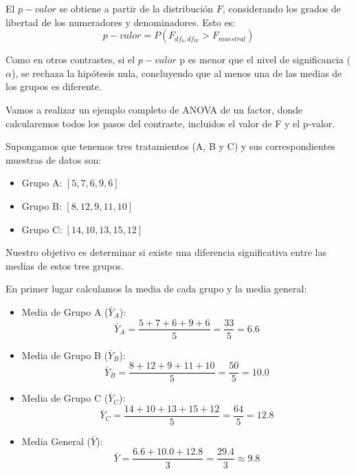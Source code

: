 \documentclass[
  letterpaper,
  DIV=11,
  numbers=noendperiod]{scrreprt}
\providecommand{\tightlist}{%
  \setlength{\itemsep}{0pt}\setlength{\parskip}{0pt}}\usepackage{longtable,booktabs,array}
\begin{document}
El \(p-valor\) se obtiene a partir de la distribución \(F\),
considerando los grados de libertad de los numeradores y denominadores.
Esto es: \[
p-valor=P(F_{df_b,df_W}>F_{muestral})
\]

Como en otros contrastes, si el \(p-valor\) p es menor que el nivel de
significancia (\(\alpha\)), se rechaza la hipótesis nula, concluyendo
que al menos una de las medias de los grupos es diferente.

\begin{tcolorbox}[enhanced jigsaw, arc=.35mm, breakable, coltitle=black, left=2mm, opacityback=0, bottomtitle=1mm, colbacktitle=quarto-callout-tip-color!10!white, title=\textcolor{quarto-callout-tip-color}{\faLightbulb}\hspace{0.5em}{Ejemplo. ANOVA de un factor}, titlerule=0mm, colback=white, colframe=quarto-callout-tip-color-frame, bottomrule=.15mm, rightrule=.15mm, opacitybacktitle=0.6, toptitle=1mm, toprule=.15mm, leftrule=.75mm]

Vamos a realizar un ejemplo completo de ANOVA de un factor, donde
calcularemos todos los pasos del contraste, incluidos el valor de F y el
p-valor.

Supongamos que tenemos tres tratamientos (A, B y C) y sus
correspondientes muestras de datos son:

\begin{itemize}
\tightlist
\item
  Grupo A: \([5, 7, 6, 9, 6]\)
\item
  Grupo B: \([8, 12, 9, 11, 10]\)
\item
  Grupo C: \([14, 10, 13, 15, 12]\)
\end{itemize}

Nuestro objetivo es determinar si existe una diferencia significativa
entre las medias de estos tres grupos.

En primer lugar calculamos la media de cada grupo y la media general:

\begin{itemize}
\item
  Media de Grupo A (\(\bar{Y}_A\)): \[
  \bar{Y}_A = \frac{5 + 7 + 6 + 9 + 6}{5} = \frac{33}{5} = 6.6
  \]
\item
  Media de Grupo B (\(\bar{Y}_B\)): \[
  \bar{Y}_B = \frac{8 + 12 + 9 + 11 + 10}{5} = \frac{50}{5} = 10.0
  \]
\item
  Media de Grupo C (\(\bar{Y}_C\)): \[
  \bar{Y}_C = \frac{14 + 10 + 13 + 15 + 12}{5} = \frac{64}{5} = 12.8
  \]
\item
  Media General (\(\bar{Y}\)): \[
  \bar{Y} = \frac{6.6 + 10.0 + 12.8}{3} = \frac{29.4}{3} \approx 9.8
  \]
\end{itemize}


\end{tcolorbox}
\end{document}
